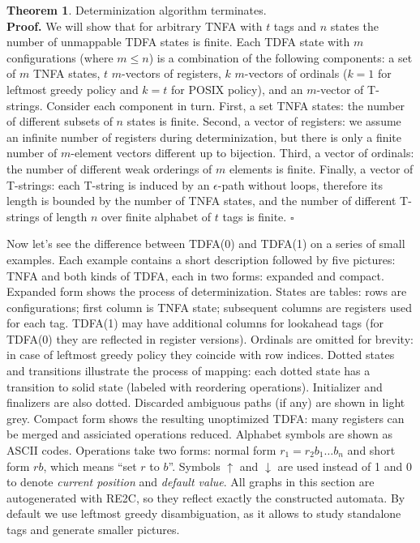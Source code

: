 \documentclass{article}
\newcommand{\Xeq}{\!=\!}
\theoremstyle{definition}
\newtheorem{XThe}{Theorem}
\begin{document}
\begin{multicols}{2}
\begin{XThe}
Determinization algorithm terminates.
\\[0.5em]
\textbf{Proof.}
We will show that for arbitrary TNFA with $t$ tags and $n$ states the number of unmappable TDFA states is finite.
Each TDFA state with $m$ configurations (where $m \!\leq\! n$) is a combination of the following components:
a set of $m$ TNFA states,
$t$ $m$-vectors of registers,
$k$ $m$-vectors of ordinals ($k \Xeq 1$ for leftmost greedy policy and $k \Xeq t$ for POSIX policy),
and an $m$-vector of T-strings.
Consider each component in turn.
First, a set TNFA states: the number of different subsets of $n$ states is finite.
Second, a vector of registers: we assume an infinite number of registers during determinization,
but there is only a finite number of $m$-element vectors different up to bijection.
Third, a vector of ordinals: the number of different weak orderings of $m$ elements is finite.
Finally, a vector of T-strings: each T-string is induced by an $\epsilon$-path without loops,
therefore its length is bounded by the number of TNFA states,
and the number of different T-strings of length $n$ over finite alphabet of $t$ tags is finite.
$\square$
\end{XThe}


Now let's see the difference between TDFA(0) and TDFA(1) on a series of small examples.
Each example contains a short description followed by five pictures:
TNFA and both kinds of TDFA, each in two forms: expanded and compact.
Expanded form shows the process of determinization.
States are tables: rows are configurations; first column is TNFA state;
subsequent columns are registers used for each tag.
TDFA(1) may have additional columns for lookahead tags (for TDFA(0) they are reflected in register versions).
Ordinals are omitted for brevity: in case of leftmost greedy policy they coincide with row indices.
Dotted states and transitions illustrate the process of mapping:
each dotted state has a transition to solid state (labeled with reordering operations).
Initializer and finalizers are also dotted.
Discarded ambiguous paths (if any) are shown in light grey.
Compact form shows the resulting unoptimized TDFA: many registers can be merged and assiciated operations reduced.
Alphabet symbols are shown as ASCII codes.
Operations take two forms: normal form $r_1 \Xeq r_2 b_1 \dots b_n$
and short form $r b$, which means ``set $r$ to $b$''.
Symbols $\uparrow$ and $\downarrow$ are used instead of 1 and 0 to denote \emph{current position} and \emph{default value}.
All graphs in this section are autogenerated with RE2C, so they reflect exactly the constructed automata.
By default we use leftmost greedy disambiguation, as it allows to study standalone tags and generate smaller pictures.
\\


\end{multicols}
\end{document}

